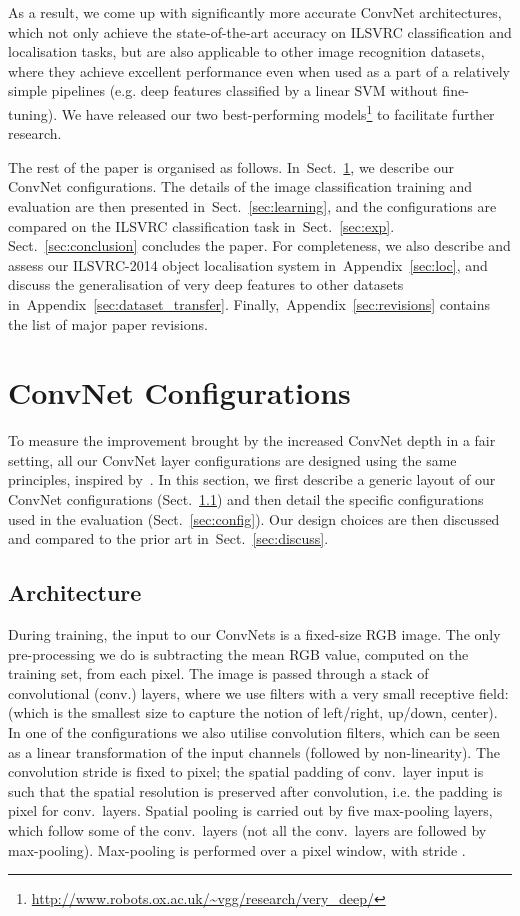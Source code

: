 \documentclass{article} \usepackage{iclr2015,times}
\makeatletter
\newcommand{\sref}[1]{Sect.~\ref{#1}}
\newcommand{\apref}[1]{Appendix~\ref{#1}}
\newcommand*{\eg}{e.g.\@\xspace}
\newcommand*{\ie}{i.e.\@\xspace}
\makeatother
\begin{document}
As a result, we come up with significantly more accurate ConvNet architectures, which not only achieve the state-of-the-art accuracy on ILSVRC classification and localisation tasks, but are also applicable to other image recognition datasets, where they achieve excellent performance even when 
used as a part of a relatively simple pipelines (\eg deep features classified by a linear SVM without fine-tuning).
We have released our two best-performing models\footnote{\url{http://www.robots.ox.ac.uk/~vgg/research/very_deep/}} to facilitate further research.

The rest of the paper is organised as follows. In~\sref{sec:arch_config}, we describe our ConvNet configurations.
The details of the image classification training and evaluation are then presented in~\sref{sec:learning}, and the configurations are compared on the ILSVRC classification task in~\sref{sec:exp}. \sref{sec:conclusion} concludes the paper.
For completeness, we also describe and assess our ILSVRC-2014 object localisation system in~\apref{sec:loc}, and discuss the generalisation of very deep features to
other datasets in~\apref{sec:dataset_transfer}. Finally,~\apref{sec:revisions} contains the list of major paper revisions.

\section{ConvNet Configurations}
\label{sec:arch_config}
To measure the improvement brought by the increased ConvNet depth in a fair setting, all our \mbox{ConvNet} layer configurations are designed using the same principles, inspired by~\citet{Ciresan11,Krizhevsky12}.
In this section, we first describe a generic layout of our \mbox{ConvNet} configurations (\sref{sec:arch}) and then detail the specific configurations used in the evaluation (\sref{sec:config}).
Our design choices are then discussed and compared to the prior art in~\sref{sec:discuss}.

\subsection{Architecture}
\label{sec:arch}
During training, the input to our ConvNets is a fixed-size  RGB image. The only pre-processing we do is subtracting the mean RGB value, computed on the training set, from each pixel.
The image is passed through a stack of convolutional (conv.) layers, where we use filters with a very small receptive field:  (which is the smallest size to capture the notion of 
left/right, up/down, center).
In one of the configurations we also utilise  convolution filters, which can be seen as a linear transformation of the input channels (followed by non-linearity).
The convolution stride is fixed to  pixel; the spatial padding of conv.\ layer input is such that the spatial resolution is preserved after convolution, \ie
the padding is  pixel for  conv.\ layers.
Spatial pooling is carried out by five max-pooling layers, which follow some of the conv.\ layers (not all the conv.\ layers are followed by max-pooling).
Max-pooling is performed over a  pixel window, with stride .
\end{document}
